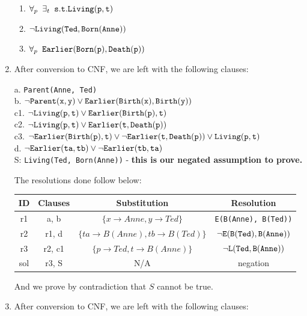 \documentclass{article}
\begin{document}
\begin{enumerate}
\begin{enumerate}
				\item $\forall_p \phantom{a} \exists_t \phantom{a} {\tt s.t. Living(p,t)}$
				
				\item ${\tt \neg Living(Ted, Born(Anne))}$
				
				\item $\forall_p \phantom{a} {\tt Earlier(Born(p), Death(p))}$
				 
			\end{enumerate}
		
		\item After conversion to CNF, we are left with the following clauses:
		
		a.\phantom{1} {\tt Parent(Anne, Ted)}\\
		b.\phantom{1} ${\tt \neg Parent(x,y) \vee Earlier(Birth(x), Birth(y))}$\\
		c1. ${\tt \neg Living(p,t) \vee Earlier(Birth(p), t)}$\\
		c2. ${\tt \neg Living(p,t) \vee Earlier(t, Death(p))}$\\
		c3. ${\tt \neg Earlier(Birth(p),t) \vee \neg Earlier(t, Death(p)) \vee Living(p,t)}$\\
		d.\phantom{1} ${\tt \neg Earlier(ta, tb) \vee \neg Earlier(tb, ta)}$\\
		S: {\tt Living(Ted, Born(Anne))} - \textbf{this is our negated assumption to prove.}
		
		The resolutions done follow below:
		
		\begin{tabular}{|c|c|c|c|}
			\hline
			ID & Clauses & Substitution & Resolution\\
			\hline
			r1 & a, b & $\{x \rightarrow Anne, y \rightarrow Ted\}$ & {\tt E(B(Anne), B(Ted))}\\
			\hline
			r2 & r1, d & $\{ta \rightarrow B(Anne), tb \rightarrow B(Ted)\}$ & ${\tt \neg E(B(Ted), B(Anne))}$\\
			\hline
			r3 & r2, c1 & $\{p \rightarrow Ted, t \rightarrow B(Anne)\}$ & ${\tt \neg L(Ted, B(Anne))}$\\
			\hline
			sol & r3, S & N/A & negation \\
			\hline
		\end{tabular}
		
		And we prove by contradiction that $S$ cannot be true.
		
		\pagebreak
		
		\item After conversion to CNF, we are left with the following clauses:
		

\end{enumerate}
\end{document}
